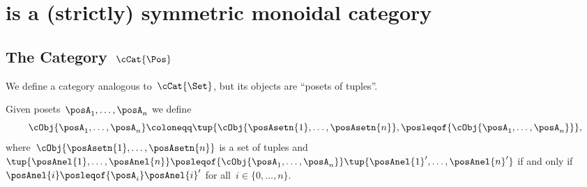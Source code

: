 
\section[\DP is (strictly) symmetric monoidal]{\DP is a (strictly) symmetric monoidal category}
\label{sec:parallelism-DP-monoidal}

\subsection{The Category~$\cCat{\Pos}$}

We define a category analogous to~$\cCat{\Set}$, but its objects are ``posets of tuples''.

Given posets~$\posA_1,\ldots, \posA_n$ we define
\begin{equation*}
    \cObj{\posA_1,\ldots, \posA_n}\coloneqq \tup{\cObj{\posAsetn{1},\ldots, \posAsetn{n}}, \posleqof{\cObj{\posA_1,\ldots, \posA_n}}},
\end{equation*}
where~$\cObj{\posAsetn{1},\ldots, \posAsetn{n}}$ is a set of tuples and~$\tup{\posAnel{1},\ldots, \posAnel{n}}\posleqof{\cObj{\posA_1,\ldots, \posA_n}}\tup{\posAnel{1}',\ldots, \posAnel{n}'}$ if and only if~$\posAnel{i}\posleqof{\posA_i} \posAnel{i}'$ for all~$i\in \{0,\ldots, n\}$.
%

